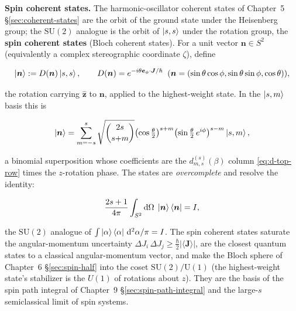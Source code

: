 \medskip\noindent\textbf{Spin coherent states.} The harmonic-oscillator coherent states of Chapter~5 \S\ref{sec:coherent-states} are the orbit of the ground state under the Heisenberg group; the $\mathrm{SU}(2)$ analogue is the orbit of $\ket{s,s}$ under the rotation group, the \textbf{spin coherent states} (Bloch coherent states). For a unit vector $\bm n\in S^{2}$ (equivalently a complex stereographic coordinate $\zeta$), define
\begin{linenomath}
\begin{equation}
\ket{\bm n}:=D(\bm n)\ket{s,s},\qquad
D(\bm n)=e^{-i\theta\bm e_{\phi}\cdot\bm J/\hbar}\;\;(\bm n=(\sin\theta\cos\phi,\sin\theta\sin\phi,\cos\theta)),
\label{eq:spin-coherent}
\end{equation}
\end{linenomath}
the rotation carrying $\hat{\bm z}$ to $\bm n$, applied to the highest-weight state. In the $\ket{s,m}$ basis this is
\begin{linenomath}
\begin{equation*}
\ket{\bm n}=\sum_{m=-s}^{s}\sqrt{\binom{2s}{s{+}m}}\bigl(\cos\tfrac{\theta}{2}\bigr)^{s+m}\bigl(\sin\tfrac{\theta}{2}\,e^{i\phi}\bigr)^{s-m}\ket{s,m},
\end{equation*}
\end{linenomath}
a binomial superposition whose coefficients are the $d^{(s)}_{m,s}(\beta)$ column \eqref{eq:d-top-row} times the $z$-rotation phase. The states are \emph{overcomplete} and resolve the identity:
\begin{linenomath}
\begin{equation}
\frac{2s+1}{4\pi}\int_{S^{2}}\mathrm{d}\Omega\;\ket{\bm n}\bra{\bm n}=I,
\label{eq:spin-coherent-resolution}
\end{equation}
\end{linenomath}
the $\mathrm{SU}(2)$ analogue of $\int\ket{\alpha}\bra{\alpha}\,\mathrm{d}^{2}\alpha/\pi=I$. The spin coherent states saturate the angular-momentum uncertainty $\Delta J_{i}\,\Delta J_{j}\ge\frac\hbar2|\langle\bm J\rangle|$, are the closest quantum states to a classical angular-momentum vector, and make the Bloch sphere of Chapter~6 \S\ref{sec:spin-half} into the coset $\mathrm{SU}(2)/\mathrm{U}(1)$ (the highest-weight state's stabilizer is the $U(1)$ of rotations about $z$). They are the basis of the spin path integral of Chapter~9 \S\ref{sec:spin-path-integral} and the large-$s$ semiclassical limit of spin systems.


